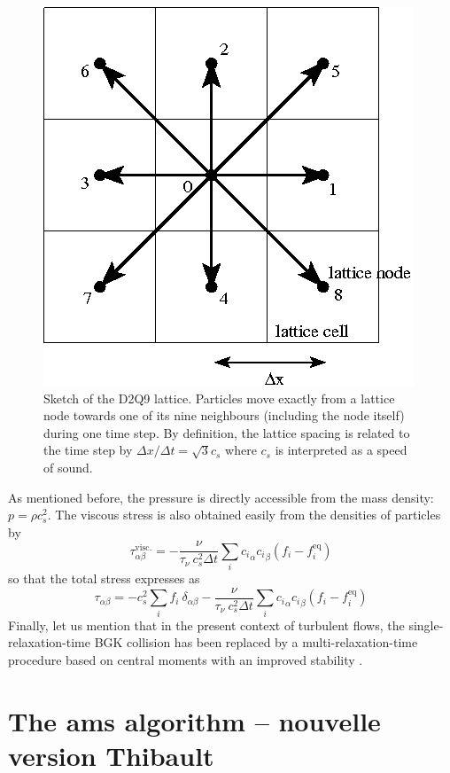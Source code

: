 \documentclass{jfm}
\newcommand{\QQ}[1]{{\color{green}{#1}}}
\begin{document}
\begin{figure}
	\centering
	\includegraphics[width=0.3\linewidth]{D2Q9/D2Q9}
	\caption{Sketch of the D2Q9 lattice. Particles move exactly from a lattice node towards one of its nine neighbours (including the node itself) during one time step. By definition, the lattice spacing is related to the time step by $\Delta x/ \Delta t = \sqrt{3} c_s$ where $c_s$ is interpreted as a speed of sound.}
	\label{fig:D2Q9}
\end{figure}

As mentioned before, the pressure is directly accessible from the mass density: $p = \rho c_s^2$. The viscous stress is also obtained easily from the densities of particles by
\[
\tau^\mathrm{visc.}_{\alpha \beta} = -\frac{\nu}{\tau_\nu ~ c_s^2 \Delta t} \sum_i  {c_i}_\alpha {c_i}_\beta (f_i - f_i^\mathrm{eq})
\]
so that the total stress expresses as
\begin{equation}\label{eq:def_stress}
\tau_{\alpha \beta} = -  c_s^2 \sum_i f_i ~ \delta_{\alpha\beta}  - \frac{\nu}{\tau_\nu ~ c_s^2 \Delta t} \sum_i  {c_i}_\alpha {c_i}_\beta (f_i - f_i^\mathrm{eq})
\end{equation}
Finally, let us mention that in the present context of turbulent flows, the single-relaxation-time BGK collision has been replaced by a multi-relaxation-time procedure based on central moments with an improved stability \citep{De_Rosis_2016}.

















\newtheorem{theo}{Theorem}
\section{The \ac{ams} algorithm -- nouvelle version Thibault}
\label{app:ams}

\QQ{Pour moi, le texte de Thibault ci-dessous est beaucoup trop détaillé (théorème, etc.) et absolument inutile pour les lecteurs de JFM ! Je proposerais de ne garder que le schéma de principe et l'application à Ornstein-Ulhenbeck (comme dans la version déjà soumise). Les referees n'ont pas demandé de détailler les algos.}
\end{document}
